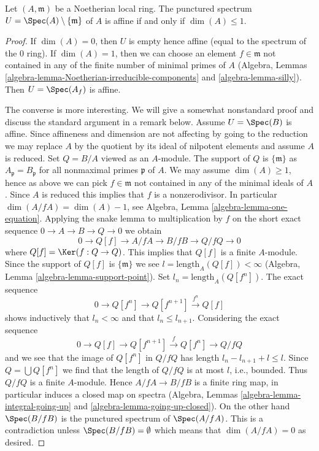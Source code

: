 \begin{lemma}
\label{lemma-affine-punctured-spec}
Let $(A, \mathfrak m)$ be a Noetherian local ring.
The punctured spectrum $U = \Spec(A) \setminus \{\mathfrak m\}$
of $A$ is affine if and only if $\dim(A) \leq 1$.
\end{lemma}

\begin{proof}
If $\dim(A) = 0$, then $U$ is empty hence affine (equal to the spectrum of
the $0$ ring). If $\dim(A) = 1$, then we can choose an element
$f \in \mathfrak m$ not contained in any of the finite number of minimal
primes of $A$
(Algebra, Lemmas \ref{algebra-lemma-Noetherian-irreducible-components} and
\ref{algebra-lemma-silly}). Then $U = \Spec(A_f)$
is affine.

\medskip\noindent
The converse is more interesting. We will give a somewhat nonstandard proof
and discuss the standard argument in a remark below.
Assume $U = \Spec(B)$ is affine. Since affineness and dimension are not
affecting by going to the reduction we may replace $A$ by the quotient by
its ideal of nilpotent elements and assume $A$ is reduced.
Set $Q = B/A$ viewed as an $A$-module.
The support of $Q$ is $\{\mathfrak m\}$ as $A_\mathfrak p = B_\mathfrak p$
for all nonmaximal primes $\mathfrak p$ of $A$.
We may assume $\dim(A) \geq 1$, hence as above we can pick
$f \in \mathfrak m$ not contained in any of the minimal ideals of $A$.
Since $A$ is reduced this implies that $f$ is a nonzerodivisor.
In particular $\dim(A/fA) = \dim(A) - 1$, see
Algebra, Lemma \ref{algebra-lemma-one-equation}.
Applying the snake lemma to multiplication by $f$ on the short
exact sequence $0 \to A \to B \to Q \to 0$ we obtain
$$
0 \to Q[f] \to A/fA \to B/fB \to Q/fQ \to 0
$$
where $Q[f] = \Ker(f : Q \to Q)$.
This implies that $Q[f]$ is a finite $A$-module. Since the support of
$Q[f]$ is $\{\mathfrak m\}$ we see $l = \text{length}_A(Q[f]) < \infty$
(Algebra, Lemma \ref{algebra-lemma-support-point}).
Set $l_n = \text{length}_A(Q[f^n])$. The exact sequence
$$
0 \to Q[f^n] \to Q[f^{n + 1}] \xrightarrow{f^n} Q[f]
$$
shows inductively that $l_n < \infty$ and that $l_n \leq l_{n + 1}$.
Considering the exact sequence
$$
0 \to Q[f] \to Q[f^{n + 1}] \xrightarrow{f} Q[f^n] \to Q/fQ
$$
and we see that the image of $Q[f^n]$ in $Q/fQ$ has length
$l_n - l_{n + 1} + l \leq l$. Since $Q = \bigcup Q[f^n]$ we
find that the length of $Q/fQ$ is at most $l$, i.e., bounded.
Thus $Q/fQ$ is a finite $A$-module. Hence $A/fA \to B/fB$ is a
finite ring map, in particular induces a closed map on spectra
(Algebra, Lemmas \ref{algebra-lemma-integral-going-up} and
\ref{algebra-lemma-going-up-closed}).
On the other hand $\Spec(B/fB)$ is the punctured spectrum of $\Spec(A/fA)$.
This is a contradiction unless $\Spec(B/fB) = \emptyset$ which
means that $\dim(A/fA) = 0$ as desired.
\end{proof}

